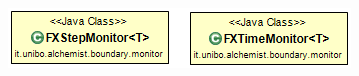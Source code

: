 \documentclass[%
]{beamer}
\begin{document}
\begin{frame}
\begin{columns}[onlytextwidth]
\begin{column}{.6\textwidth}
{                            \bigskip

                            \includegraphics[scale=0.45]{uml/FXTimeStepMonitor}
                        }
                    \end{column}
                \end{columns}
            \end{frame}

\end{document}
